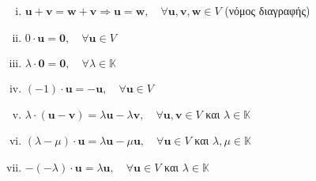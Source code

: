 \begin{thm}
\item {}
    \begin{enumerate}[i)]
        \item $ \mathbf{u} + \mathbf{v} = \mathbf{w} + \mathbf{v} 
            \Rightarrow \mathbf{u} = \mathbf{w}, \quad \forall \mathbf{u}, 
            \mathbf{v}, \mathbf{w} \in V $ \quad (νόμος διαγραφής)
        \item $ 0 \cdot \mathbf{u} = \mathbf{0}, \quad \forall \mathbf{u} \in V $
        \item $ \lambda \cdot \mathbf{0} = \mathbf{0}, \quad \forall \lambda \in 
            \mathbb{K} $
        \item $ (-1)\cdot \mathbf{u} = - \mathbf{u}, \quad \forall \mathbf{u} \in V $ 
        \item $ \lambda \cdot (\mathbf{u} - \mathbf{v}) = 
            \lambda \mathbf{u} - \lambda \mathbf{v}, \quad \forall \mathbf{u}, 
            \mathbf{v} \in V $ και $ \lambda \in \mathbb{K} $
        \item $ (\lambda - \mu ) \cdot \mathbf{u} = \lambda \mathbf{u} - 
            \mu \mathbf{u}, \quad \forall \mathbf{u} \in V $ και $ \lambda, 
            \mu \in \mathbb{K} $
        \item $ -(- \lambda ) \cdot \mathbf{u} = \lambda \mathbf{u}, 
            \quad \forall \mathbf{u} \in V $ και $ \lambda \in \mathbb{K} $
    \end{enumerate}
\end{thm}

